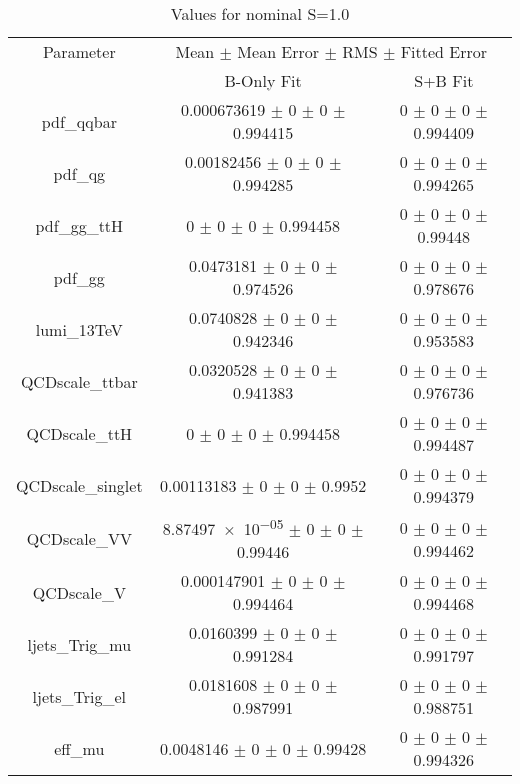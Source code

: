 \begin{table}
\centering
\caption{Values for nominal S=1.0}
\begin{tabular}{ccc}
\toprule
Parameter & \multicolumn{2}{c}{Mean $\pm$ Mean Error $\pm$ RMS $\pm$ Fitted Error}\\
 & B-Only Fit & S+B Fit\\
\midrule
pdf\_qqbar & \num{0.000673619} $\pm$ \num{0} $\pm$ \num{0} $\pm$ \num{0.994415} & \num{0} $\pm$ \num{0} $\pm$ \num{0} $\pm$ \num{0.994409}\\
pdf\_qg & \num{0.00182456} $\pm$ \num{0} $\pm$ \num{0} $\pm$ \num{0.994285} & \num{0} $\pm$ \num{0} $\pm$ \num{0} $\pm$ \num{0.994265}\\
pdf\_gg\_ttH & \num{0} $\pm$ \num{0} $\pm$ \num{0} $\pm$ \num{0.994458} & \num{0} $\pm$ \num{0} $\pm$ \num{0} $\pm$ \num{0.99448}\\
pdf\_gg & \num{0.0473181} $\pm$ \num{0} $\pm$ \num{0} $\pm$ \num{0.974526} & \num{0} $\pm$ \num{0} $\pm$ \num{0} $\pm$ \num{0.978676}\\
lumi\_13TeV & \num{0.0740828} $\pm$ \num{0} $\pm$ \num{0} $\pm$ \num{0.942346} & \num{0} $\pm$ \num{0} $\pm$ \num{0} $\pm$ \num{0.953583}\\
QCDscale\_ttbar & \num{0.0320528} $\pm$ \num{0} $\pm$ \num{0} $\pm$ \num{0.941383} & \num{0} $\pm$ \num{0} $\pm$ \num{0} $\pm$ \num{0.976736}\\
QCDscale\_ttH & \num{0} $\pm$ \num{0} $\pm$ \num{0} $\pm$ \num{0.994458} & \num{0} $\pm$ \num{0} $\pm$ \num{0} $\pm$ \num{0.994487}\\
QCDscale\_singlet & \num{0.00113183} $\pm$ \num{0} $\pm$ \num{0} $\pm$ \num{0.9952} & \num{0} $\pm$ \num{0} $\pm$ \num{0} $\pm$ \num{0.994379}\\
QCDscale\_VV & \num{8.87497e-05} $\pm$ \num{0} $\pm$ \num{0} $\pm$ \num{0.99446} & \num{0} $\pm$ \num{0} $\pm$ \num{0} $\pm$ \num{0.994462}\\
QCDscale\_V & \num{0.000147901} $\pm$ \num{0} $\pm$ \num{0} $\pm$ \num{0.994464} & \num{0} $\pm$ \num{0} $\pm$ \num{0} $\pm$ \num{0.994468}\\
ljets\_Trig\_mu & \num{0.0160399} $\pm$ \num{0} $\pm$ \num{0} $\pm$ \num{0.991284} & \num{0} $\pm$ \num{0} $\pm$ \num{0} $\pm$ \num{0.991797}\\
ljets\_Trig\_el & \num{0.0181608} $\pm$ \num{0} $\pm$ \num{0} $\pm$ \num{0.987991} & \num{0} $\pm$ \num{0} $\pm$ \num{0} $\pm$ \num{0.988751}\\
eff\_mu & \num{0.0048146} $\pm$ \num{0} $\pm$ \num{0} $\pm$ \num{0.99428} & \num{0} $\pm$ \num{0} $\pm$ \num{0} $\pm$ \num{0.994326}\\

\end{tabular}
\end{table}
